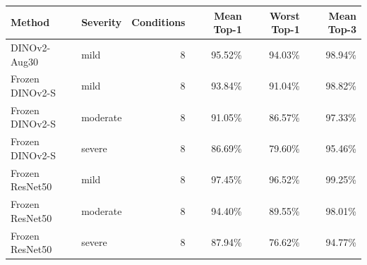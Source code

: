 \begin{tabular}{llrrrr}
\toprule
Method & Severity & Conditions & Mean Top-1 & Worst Top-1 & Mean Top-3 \\
\midrule
DINOv2-Aug30 & mild & 8 & 95.52\% & 94.03\% & 98.94\% \\
Frozen DINOv2-S & mild & 8 & 93.84\% & 91.04\% & 98.82\% \\
Frozen DINOv2-S & moderate & 8 & 91.05\% & 86.57\% & 97.33\% \\
Frozen DINOv2-S & severe & 8 & 86.69\% & 79.60\% & 95.46\% \\
Frozen ResNet50 & mild & 8 & 97.45\% & 96.52\% & 99.25\% \\
Frozen ResNet50 & moderate & 8 & 94.40\% & 89.55\% & 98.01\% \\
Frozen ResNet50 & severe & 8 & 87.94\% & 76.62\% & 94.77\% \\
\bottomrule
\end{tabular}
